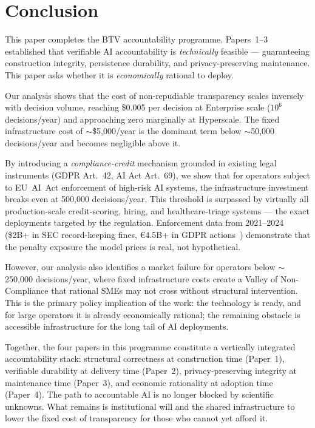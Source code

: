 \section{Conclusion}
\label{sec:conclusion}

This paper completes the BTV accountability programme. Papers~1--3
established that verifiable AI accountability is \emph{technically}
feasible --- guaranteeing construction integrity, persistence
durability, and privacy-preserving maintenance. This paper asks whether
it is \emph{economically} rational to deploy.

Our analysis shows that the cost of non-repudiable transparency scales
inversely with decision volume, reaching \$0.005 per decision at
Enterprise scale ($10^6$ decisions/year) and approaching zero
marginally at Hyperscale. The fixed infrastructure cost of
$\sim$\$5{,}000/year is the dominant term below $\sim$50{,}000
decisions/year and becomes negligible above it.

By introducing a \emph{compliance-credit} mechanism grounded in
existing legal instruments (GDPR Art.~42, AI Act Art.~69), we show
that for operators subject to EU~AI~Act enforcement of high-risk AI
systems, the infrastructure investment breaks even at 500{,}000
decisions/year. This threshold is surpassed by virtually all
production-scale credit-scoring, hiring, and healthcare-triage
systems --- the exact deployments targeted by the regulation.
Enforcement data from 2021--2024 (\$2B+ in SEC record-keeping fines,
\euro{}4.5B+ in GDPR actions~\cite{sec-fines-2024,gdpr-fines-2025})
demonstrate that the penalty exposure the model prices is real, not
hypothetical.

However, our analysis also identifies a market failure for operators
below $\sim$250{,}000 decisions/year, where fixed infrastructure costs
create a Valley of Non-Compliance that rational SMEs may not cross
without structural intervention. This is the primary policy implication
of the work: the technology is ready, and for large operators it is
already economically rational; the remaining obstacle is accessible
infrastructure for the long tail of AI deployments.

Together, the four papers in this programme constitute a vertically
integrated accountability stack: structural correctness at construction
time (Paper~1), verifiable durability at delivery time (Paper~2),
privacy-preserving integrity at maintenance time (Paper~3), and
economic rationality at adoption time (Paper~4). The path to
accountable AI is no longer blocked by scientific unknowns. What
remains is institutional will and the shared infrastructure to lower
the fixed cost of transparency for those who cannot yet afford it.

